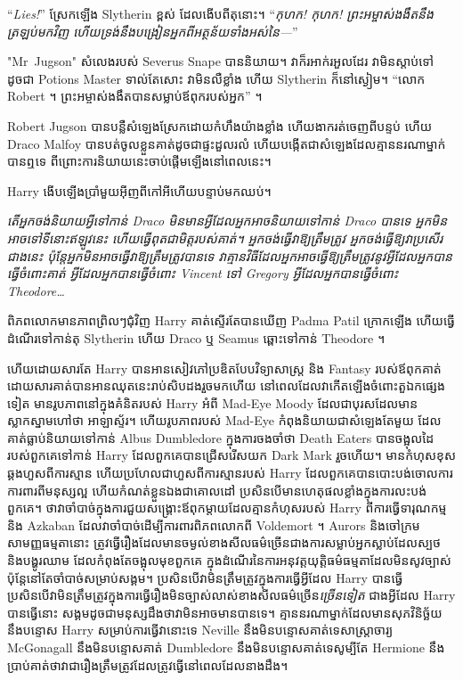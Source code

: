 “\emph{Lies!}” ស្រែកឡើង Slytherin ខ្ពស់ ដែលងើបពីតុនោះ។ “\emph{កុហក! កុហក! ព្រះអម្ចាស់ងងឹតនឹងត្រឡប់មកវិញ ហើយទ្រង់នឹងបង្រៀនអ្នកពីអត្ថន័យទាំងអស់នៃ—}”

"Mr~Jugson" សំលេងរបស់ Severus Snape បាននិយាយ។ វាក៏រអាក់រអួលដែរ វាមិនស្តាប់ទៅដូចជា Potions Master ទាល់តែសោះ វាមិនលឺខ្លាំង ហើយ Slytherin ក៏នៅស្ងៀម។ “លោក Robert ។ ព្រះអម្ចាស់ងងឹតបានសម្លាប់ឪពុករបស់អ្នក” ។

Robert Jugson បានបន្លឺសំឡេងស្រែកដោយកំហឹងយ៉ាងខ្លាំង ហើយងាករត់ចេញពីបន្ទប់ ហើយ Draco Malfoy បានបត់ចូលខ្លួនគាត់ដូចជាផ្ទះដួលរលំ ហើយបង្កើតជាសំឡេងដែលគ្មាននរណាម្នាក់បានឮទេ ពីព្រោះការនិយាយនេះចាប់ផ្តើមឡើងនៅពេលនេះ។

Harry ងើបឡើងប្រាំមួយអ៊ីញពីកៅអីហើយបន្ទាប់មកឈប់។

\emph{តើអ្នកចង់និយាយអ្វីទៅកាន់ Draco មិនមានអ្វីដែលអ្នកអាចនិយាយទៅកាន់ Draco បានទេ អ្នកមិនអាចទៅទីនោះឥឡូវនេះ ហើយធ្វើពុតជាមិត្តរបស់គាត់។ អ្នកចង់ធ្វើវាឱ្យត្រឹមត្រូវ អ្នកចង់ធ្វើឱ្យវាប្រសើរជាងនេះ ប៉ុន្តែអ្នកមិនអាចធ្វើវាឱ្យត្រឹមត្រូវបានទេ វាគ្មានវិធីដែលអ្នកអាចធ្វើឱ្យត្រឹមត្រូវនូវអ្វីដែលអ្នកបានធ្វើចំពោះគាត់ អ្វីដែលអ្នកបានធ្វើចំពោះ Vincent ទៅ Gregory អ្វីដែលអ្នកបានធ្វើចំពោះ Theodore…}

ពិភពលោកមានភាពព្រិលៗជុំវិញ Harry គាត់ស្ទើរតែបានឃើញ Padma Patil ក្រោកឡើង ហើយធ្វើដំណើរទៅកាន់តុ Slytherin ហើយ Draco ឬ Seamus ឆ្ពោះទៅកាន់ Theodore ។

ហើយដោយសារតែ Harry បានអានសៀវភៅប្រឌិតបែបវិទ្យាសាស្ត្រ និង Fantasy របស់ឪពុកគាត់ ដោយសារគាត់បានអានឈុតនេះរាប់សិបដងរួចមកហើយ នៅពេលដែលវាកើតឡើងចំពោះតួឯកផ្សេងទៀត មានរូបភាពនៅក្នុងគំនិតរបស់ Harry អំពី Mad-Eye Moody ដែលជាបុរសដែលមានស្លាកស្នាមហៅថា អាឡាស្ទ័រ។ ហើយរូបភាពរបស់ Mad-Eye កំពុងនិយាយជាសំឡេងតែមួយ ដែលគាត់ធ្លាប់និយាយទៅកាន់ Albus Dumbledore ក្នុងការចងចាំថា Death Eaters បានចង្អុលដៃរបស់ពួកគេទៅកាន់ Harry ដែលពួកគេបានជ្រើសរើសយក Dark Mark រួចហើយ។ មានកំហុសខុសឆ្គងហួសពីការស្មាន ហើយប្រហែលជាហួសពីការស្មានរបស់ Harry ដែលពួកគេបានបោះបង់ចោលការការពារពីមនុស្សល្អ ហើយកំណត់ខ្លួនឯងជាគោលដៅ ប្រសិនបើមានហេតុផលខ្លាំងក្នុងការលះបង់ពួកគេ។ ថាវាចាំបាច់ក្នុងការជួយសង្គ្រោះឪពុកម្តាយដែលគ្មានកំហុសរបស់ Harry ពីការធ្វើទារុណកម្មនិង Azkaban ដែលវាចាំបាច់ដើម្បីការពារពិភពលោកពី Voldemort ។ Aurors និងចៅក្រមសាមញ្ញធម្មតានោះ ត្រូវធ្វើរឿងដែលមានចម្ងល់ខាងសីលធម៌ច្រើនជាងការសម្លាប់អ្នកស្លាប់ដែលស្បថ និងបង្ហូរឈាម ដែលកំពុងតែចង្អុលមុខពួកគេ ក្នុងដំណើរនៃការអនុវត្តយុត្តិធម៌ធម្មតាដែលមិនសូវច្បាស់ ប៉ុន្តែនៅតែចាំបាច់សម្រាប់សង្គម។ ប្រសិនបើវាមិនត្រឹមត្រូវក្នុងការធ្វើអ្វីដែល Harry បានធ្វើ ប្រសិនបើវាមិនត្រឹមត្រូវក្នុងការធ្វើរឿងមិនច្បាស់លាស់ខាងសីលធម៌ច្រើន\emph{ច្រើនទៀត} ជាងអ្វីដែល Harry បានធ្វើនោះ សង្គមដូចជាមនុស្សដឹងថាវាមិនអាចមានបានទេ។ គ្មាននរណាម្នាក់ដែលមានសុភវិនិច្ឆ័យនឹងបន្ទោស Harry សម្រាប់ការធ្វើវានោះទេ Neville នឹងមិនបន្ទោសគាត់ទេសាស្រ្តាចារ្យ McGonagall នឹងមិនបន្ទោសគាត់ Dumbledore នឹងមិនបន្ទោសគាត់ទេសូម្បីតែ Hermione នឹងប្រាប់គាត់ថាវាជារឿងត្រឹមត្រូវដែលត្រូវធ្វើនៅពេលដែលនាងដឹង។

